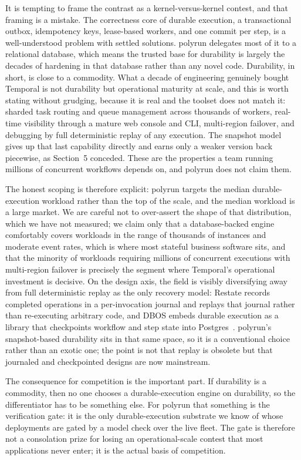 \documentclass[11pt]{article}
\newcommand{\tool}[1]{\textsf{#1}}
\begin{document}
It is tempting to frame the contrast as a kernel-versus-kernel contest, and that
framing is a mistake. The correctness core of durable execution, a transactional
outbox, idempotency keys, lease-based workers, and one commit per step, is a
well-understood problem with settled solutions. \tool{polyrun} delegates most of
it to a relational database, which means the trusted base for durability is
largely the decades of hardening in that database rather than any novel code.
Durability, in short, is close to a commodity. What a decade of engineering
genuinely bought Temporal is not durability but operational maturity at scale,
and this is worth stating without grudging, because it is real and the toolset
does not match it: sharded task routing and queue management across thousands of
workers, real-time visibility through a mature web console and CLI, multi-region
failover, and debugging by full deterministic replay of any execution. The
snapshot model gives up that last capability directly and earns only a weaker
version back piecewise, as Section~5 conceded. These are the properties a team
running millions of concurrent workflows depends on, and \tool{polyrun} does not
claim them.

The honest scoping is therefore explicit: \tool{polyrun} targets the median
durable-execution workload rather than the top of the scale, and the median
workload is a large market. We are careful not to over-assert the shape of that
distribution, which we have not measured; we claim only that a database-backed
engine comfortably covers workloads in the range of thousands of instances and
moderate event rates, which is where most stateful business software sits, and
that the minority of workloads requiring millions of concurrent executions with
multi-region failover is precisely the segment where Temporal's operational
investment is decisive. On the design axis, the field is visibly diversifying
away from full deterministic replay as the only recovery model: Restate records
completed operations in a per-invocation journal and replays that journal rather
than re-executing arbitrary code, and DBOS embeds durable execution as a library
that checkpoints workflow and step state into Postgres~\cite{restate, dbos}.
\tool{polyrun}'s snapshot-based durability sits in that same space, so it is a
conventional choice rather than an exotic one; the point is not that replay is
obsolete but that journaled and checkpointed designs are now mainstream.

The consequence for competition is the important part. If durability is a
commodity, then no one chooses a durable-execution engine on durability, so the
differentiator has to be something else. For \tool{polyrun} that something is the
verification gate: it is the only durable-execution substrate we know of whose
deployments are gated by a model check over the live fleet. The gate is therefore
not a consolation prize for losing an operational-scale contest that most
applications never enter; it is the actual basis of competition.
\end{document}
